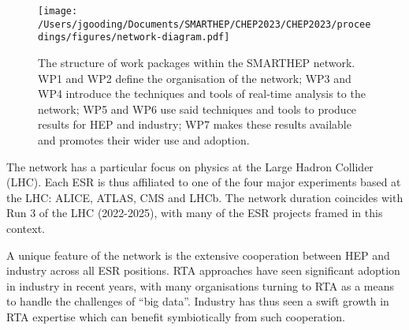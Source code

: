 \begin{figure*}[h!]
    \centering
    \texttt{[image: /Users/jgooding/Documents/SMARTHEP/CHEP2023/CHEP2023/proceedings/figures/network-diagram.pdf]}
    \caption{The structure of work packages within the SMARTHEP network. WP1 and WP2 define the organisation of the network; WP3 and WP4 introduce the techniques and tools of real-time analysis to the network; WP5 and WP6 use said techniques and tools to produce results for HEP and industry; WP7 makes these results available and promotes their wider use and adoption.}
    \label{network-diagram}
\end{figure*}

The network has a particular focus on physics at the Large Hadron Collider (LHC). Each ESR is thus affiliated to one of the four major experiments based at the LHC: ALICE, ATLAS, CMS and LHCb. The network duration coincides with Run 3 of the LHC (2022-2025), with many of the ESR projects framed in this context.

A unique feature of the network is the extensive cooperation between HEP and industry across all ESR positions. RTA approaches have seen significant adoption in industry in recent years, with many organisations turning to RTA as a means to handle the challenges of ``big data''. Industry has thus seen a swift growth in RTA expertise which can benefit symbiotically from such cooperation.